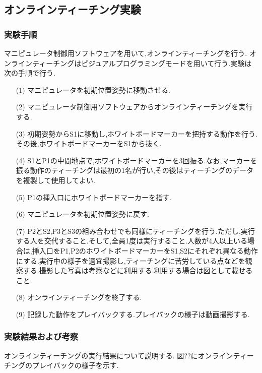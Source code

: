 \subsection{オンラインティーチング実験}

\subsubsection{実験手順}
マニピュレータ制御用ソフトウェアを用いて,オンラインティーチングを行う.
オンラインティーチングはビジュアルプログラミングモードを用いて行う.実験は次の手順で行う.

\begin{enumerate}
  \item[(1)] マニピュレータを初期位置姿勢に移動させる.
  \item[(2)] マニピュレータ制御用ソフトウェアからオンラインティーチングを実行する.
  \item[(3)] 初期姿勢からS1に移動し,ホワイトボードマーカーを把持する動作を行う.その後,ホワイトボードマーカーをS1から抜く.
  \item[(4)] S1とP1の中間地点で,ホワイトボードマーカーを3回振る.なお,マーカーを振る動作のティーチングは最初の1名が行い,その後はティーチングのデータを複製して使用してよい.
  \item[(5)] P1の挿入口にホワイトボードマーカーを指す.
  \item[(6)] マニピュレータを初期位置姿勢に戻す.
  \item[(7)] P2とS2,P3とS3の組み合わせでも同様にティーチングを行う.ただし,実行する人を交代すること.そして,全員1度は実行すること.人数が4人以上いる場合は,挿入口をP1,P2のホワイトボードマーカーをS1,S2にそれぞれ異なる動作にする.実行中の様子を適宜撮影し,ティーチングに苦労している点などを観察する.撮影した写真は考察などに利用する.利用する場合は図として載せること.
  \item[(8)] オンラインティーチングを終了する.
  \item[(9)] 記録した動作をプレイバックする.プレイバックの様子は動画撮影する.
\end{enumerate}

\subsubsection{実験結果および考察}
オンラインティーチングの実行結果について説明する.  
図??にオンラインティーチングのプレイバックの様子を示す.  

